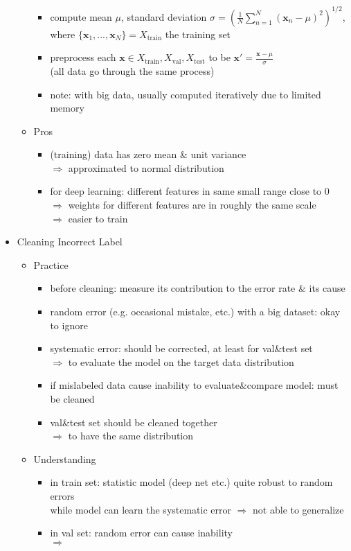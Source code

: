 \begin{itemize}
\begin{itemize}
\begin{itemize}
		\item compute mean $\mu$, standard deviation $\displaystyle \sigma=\left( \frac 1 N \sum_{n=1}^N{(\mathbf x_n-\mu)^2} \right)^{1/2}$, \\
		where $\{\mathbf x_1,...,\mathbf x_N\}=X_\text{train}$ the training set
		\item preprocess each $\mathbf x \in X_\text{train}, X_\text{val}, X_\text{test}$ to be $\mathbf x'=\frac{\mathbf x -\mu} \sigma$ \\ 
		(all data go through the same process)
		\item note: with big data, usually computed iteratively due to limited memory
		\end{itemize}
	\item Pros
		\begin{itemize}
		\item (training) data has zero mean \& unit variance \\
		$\Rightarrow$ approximated to normal distribution
		\item for deep learning: different features in same small range close to $0$ \\
		$\Rightarrow$ weights for different features are in roughly the same scale \\
		$\Rightarrow$ easier to train
		\end{itemize}
	\end{itemize}

\item Cleaning Incorrect Label
	\begin{itemize}
	\item Practice 
		\begin{itemize}
		\item before cleaning: measure its contribution to the error rate \& its cause
		\item random error (e.g. occasional mistake, etc.) with a big dataset: okay to ignore
		\item systematic error: should be corrected, at least for val\&test set \\
		$\Rightarrow$ to evaluate the model on the target data distribution
		\item if mislabeled data cause inability to evaluate\&compare model: must be cleaned
		\item val\&test set should be cleaned together \\
		$\Rightarrow$ to have the same distribution
		\end{itemize}
	\item Understanding
		\begin{itemize}
		\item in train set: statistic model (deep net etc.) quite robust to random errors \\
		while model can learn the systematic error $\Rightarrow$ not able to generalize
		\item in val set: random error can cause inability  \\ 
		$\Rightarrow$ 
		\end{itemize}
	\end{itemize}
\end{itemize}

